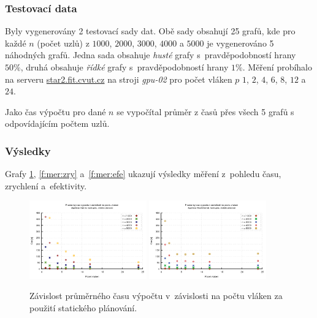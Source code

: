 \subsubsection{Testovací data} \label{l:testdata}
Byly vygenerovány 2 testovací sady dat. Obě sady obsahují 25 grafů, kde pro každé $n$ (počet uzlů) z $1000$, $2000$, $3000$, $4000$ a $5000$ 
je vygenerováno 5 náhodných grafů. Jedna sada obsahuje \emph{husté} grafy s~pravděpodobností hrany $50 \%$, druhá obsahuje \emph{řídké} grafy
s~pravděpodobností hrany $1 \%$.
Měření probíhalo na serveru \url{star2.fit.cvut.cz} na stroji \textit{gpu-02} pro počet vláken $p$ $1$, $2$, $4$, $6$, $8$, $12$ a $24$.

Jako čas výpočtu pro dané $n$ se vypočítal průměr z časů přes všech 5 grafů s odpovídajícím počtem uzlů.

\subsubsection{Výsledky}
\label{l:vysledky}
Grafy \ref{f:mer:cas}, \ref{f:mer:zry} a~\ref{f:mer:efe} ukazují výsledky měření z~pohledu času, zrychlení a~efektivity.

\begin{figure}
    \centering
    \includegraphics[width=0.45\textwidth]{../grafy/02_openMP/02-01-Dijkstra_cas_v1}
    \includegraphics[width=0.45\textwidth]{../grafy/02_openMP/02-01-Floyd_cas_v1}
    \caption{Závislost průměrného času výpočtu v~závislosti na počtu vláken za použití statického plánování.}
    \label{f:mer:cas}
\end{figure}


